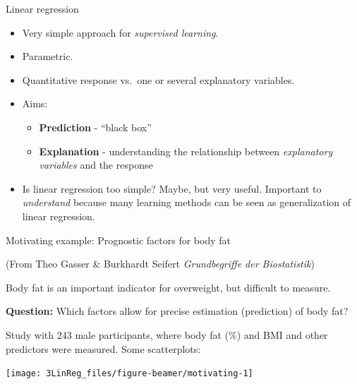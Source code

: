 \documentclass[10pt,ignorenonframetext,]{beamer}
\providecommand{\tightlist}{%
  \setlength{\itemsep}{0pt}\setlength{\parskip}{0pt}}
\begin{document}
\begin{frame}{Linear regression}

\begin{itemize}
\item
  Very simple approach for \emph{supervised learning}.
\item
  Parametric.
\item
  Quantitative response vs.~one or several explanatory variables.
\item
  Aims:

  \begin{itemize}
  \tightlist
  \item
    \textbf{Prediction} - ``black box''
  \item
    \textbf{Explanation} - understanding the relationship between
    \emph{explanatory variables} and the response
  \end{itemize}
\item
  Is linear regression too simple? Maybe, but very useful. Important to
  \emph{understand} because many learning methods can be seen as
  generalization of linear regression.
\end{itemize}

\end{frame}

\begin{frame}

\begin{block}{Motivating example: Prognostic factors for body fat}

\tiny(From Theo Gasser \& Burkhardt Seifert \emph{Grundbegriffe der
Biostatistik})

\vspace{2mm} \normalsize
Body fat is an important indicator for overweight, but difficult to
measure.

\vspace{2mm} \textbf{Question:} Which factors allow for precise
estimation (prediction) of body fat?

\vspace{2mm} Study with 243 male participants, where body fat (\%) and
BMI and other predictors were measured. Some scatterplots:

\begin{center}\texttt{[image: 3LinReg\_files/figure-beamer/motivating-1]} \end{center}

\end{block}

\end{frame}
\end{document}
